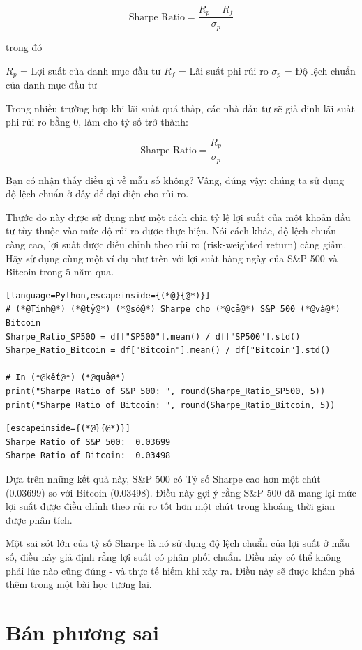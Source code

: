 \[\text{Sharpe Ratio} = \frac{R_p - R_f}{\sigma_p}\]

trong đó

$R_p$ = Lợi suất của danh mục đầu tư $R_f$ = Lãi suất phi rủi ro $\sigma_p$ = Độ lệch chuẩn của danh mục đầu tư

Trong nhiều trường hợp khi lãi suất quá thấp, các nhà đầu tư sẽ giả định lãi suất phi rủi ro bằng 0, làm cho tỷ số trở thành:

\[\text{Sharpe Ratio} = \frac{R_p}{\sigma_p}\]

Bạn có nhận thấy điều gì về mẫu số không? Vâng, đúng vậy: chúng ta sử dụng độ lệch chuẩn ở đây để đại diện cho rủi ro.

Thước đo này được sử dụng như một cách chia tỷ lệ lợi suất của một khoản đầu tư tùy thuộc vào mức độ rủi ro được thực hiện. Nói cách khác, độ lệch chuẩn càng cao, lợi suất được điều chỉnh theo rủi ro (risk-weighted return) càng giảm. Hãy sử dụng cùng một ví dụ như trên với lợi suất hàng ngày của S\&P 500 và Bitcoin trong 5 năm qua.

\begin{lstlisting}[language=Python,escapeinside={(*@}{@*)}]
# (*@Tính@*) (*@tỷ@*) (*@số@*) Sharpe cho (*@cả@*) S&P 500 (*@và@*) Bitcoin
Sharpe_Ratio_SP500 = df["SP500"].mean() / df["SP500"].std()
Sharpe_Ratio_Bitcoin = df["Bitcoin"].mean() / df["Bitcoin"].std()

# In (*@kết@*) (*@quả@*)
print("Sharpe Ratio of S&P 500: ", round(Sharpe_Ratio_SP500, 5))
print("Sharpe Ratio of Bitcoin: ", round(Sharpe_Ratio_Bitcoin, 5))
\end{lstlisting}

\begin{lstlisting}[escapeinside={(*@}{@*)}]
Sharpe Ratio of S&P 500:  0.03699
Sharpe Ratio of Bitcoin:  0.03498
\end{lstlisting}

Dựa trên những kết quả này, S\&P 500 có Tỷ số Sharpe cao hơn một chút (0.03699) so với Bitcoin (0.03498). Điều này gợi ý rằng S\&P 500 đã mang lại mức lợi suất được điều chỉnh theo rủi ro tốt hơn một chút trong khoảng thời gian được phân tích.

Một sai sót lớn của tỷ số Sharpe là nó sử dụng độ lệch chuẩn của lợi suất ở mẫu số, điều này giả định rằng lợi suất có phân phối chuẩn. Điều này có thể không phải lúc nào cũng đúng - và thực tế hiếm khi xảy ra. Điều này sẽ được khám phá thêm trong một bài học tương lai.

\section{Bán phương sai}

